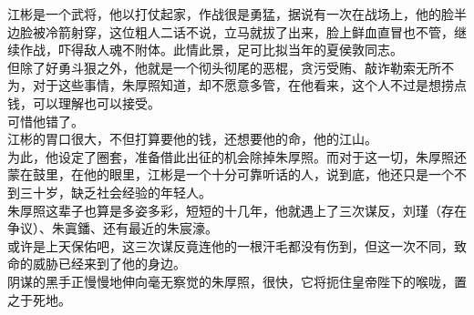 \begin{multicols}{\theparacolNo}
江彬是一个武将，他以打仗起家，作战很是勇猛，据说有一次在战场上，他的脸半边脸被冷箭射穿，这位粗人二话不说，立马就拔了出来，脸上鲜血直冒也不管，继续作战，吓得敌人魂不附体。此情此景，足可比拟当年的夏侯敦同志。\\

但除了好勇斗狠之外，他就是一个彻头彻尾的恶棍，贪污受贿、敲诈勒索无所不为，对于这些事情，朱厚照知道，却不愿意多管，在他看来，这个人不过是想捞点钱，可以理解也可以接受。\\

可惜他错了。\\

江彬的胃口很大，不但打算要他的钱，还想要他的命，他的江山。\\

为此，他设定了圈套，准备借此出征的机会除掉朱厚照。而对于这一切，朱厚照还蒙在鼓里，在他的眼里，江彬是一个十分可靠听话的人，说到底，他还只是一个不到三十岁，缺乏社会经验的年轻人。\\

朱厚照这辈子也算是多姿多彩，短短的十几年，他就遇上了三次谋反，刘瑾（存在争议）、朱寘鐇、还有最近的朱宸濠。\\

或许是上天保佑吧，这三次谋反竟连他的一根汗毛都没有伤到，但这一次不同，致命的威胁已经来到了他的身边。\\

阴谋的黑手正慢慢地伸向毫无察觉的朱厚照，很快，它将扼住皇帝陛下的喉咙，置之于死地。\\
\ifnum{}
	\end{multicols}
\fi
\newpage
